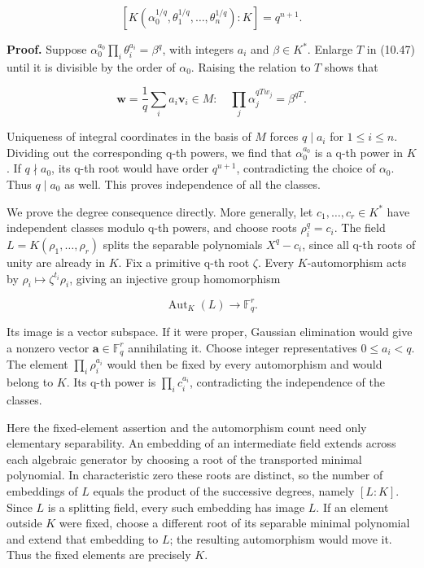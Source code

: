 \documentclass[
  11pt,
  a4paper,
]{article}
\begin{document}
\[
 [K(\alpha_0^{1/q},\theta_1^{1/q},\ldots,\theta_n^{1/q}):K]
 =q^{n+1}.
\tag{10.48}
\]

\textbf{Proof.} Suppose \(\alpha_0^{a_0}\prod_i\theta_i^{a_i}=\beta^q\),
with integers \(a_i\) and \(\beta\in K^*\). Enlarge \(T\) in (10.47)
until it is divisible by the order of \(\alpha_0\). Raising the relation
to \(T\) shows that

\[
 \boldsymbol w=\frac1q\sum_i a_i\boldsymbol v_i\in M:
 \quad \prod_j\alpha_j^{qT w_j}=\beta^{qT}.
\]

Uniqueness of integral coordinates in the basis of \(M\) forces
\(q\mid a_i\) for \(1\le i\le n\). Dividing out the corresponding q-th
powers, we find that \(\alpha_0^{a_0}\) is a q-th power in \(K\). If
\(q\nmid a_0\), its q-th root would have order \(q^{u+1}\),
contradicting the choice of \(\alpha_0\). Thus \(q\mid a_0\) as well.
This proves independence of all the classes.

We prove the degree consequence directly. More generally, let
\(c_1,\ldots,c_r\in K^*\) have independent classes modulo q-th powers,
and choose roots \(\rho_i^q=c_i\). The field
\(L=K(\rho_1,\ldots,\rho_r)\) splits the separable polynomials
\(X^q-c_i\), since all q-th roots of unity are already in \(K\). Fix a
primitive q-th root \(\zeta\). Every \(K\)-automorphism acts by
\(\rho_i\mapsto\zeta^{t_i}\rho_i\), giving an injective group
homomorphism

\[
 \operatorname{Aut}_K(L)\longrightarrow\mathbb F_q^r.
\]

Its image is a vector subspace. If it were proper, Gaussian elimination
would give a nonzero vector \(\boldsymbol a\in\mathbb F_q^r\)
annihilating it. Choose integer representatives \(0\le a_i<q\). The
element \(\prod_i\rho_i^{a_i}\) would then be fixed by every
automorphism and would belong to \(K\). Its q-th power is
\(\prod_i c_i^{a_i}\), contradicting the independence of the classes.

Here the fixed-element assertion and the automorphism count need only
elementary separability. An embedding of an intermediate field extends
across each algebraic generator by choosing a root of the transported
minimal polynomial. In characteristic zero these roots are distinct, so
the number of embeddings of \(L\) equals the product of the successive
degrees, namely \([L:K]\). Since \(L\) is a splitting field, every such
embedding has image \(L\). If an element outside \(K\) were fixed,
choose a different root of its separable minimal polynomial and extend
that embedding to \(L\); the resulting automorphism would move it. Thus
the fixed elements are precisely \(K\).
\end{document}
